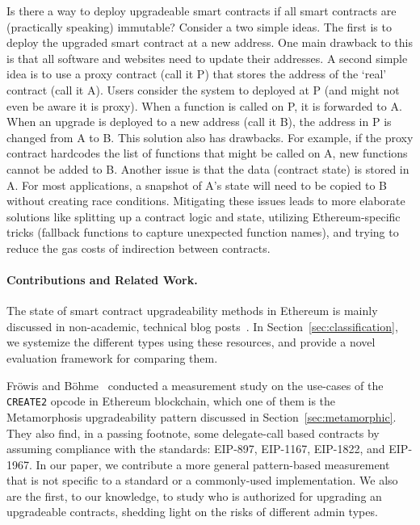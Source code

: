 Is there a way to deploy upgradeable smart contracts if all smart contracts are (practically speaking) immutable? Consider a two simple ideas. The first is to deploy the upgraded smart contract at a new address. One main drawback to this is that all software and websites need to update their addresses. A second simple idea is to use a proxy contract (call it P) that stores the address of the `real' contract (call it A). Users consider the system to deployed at P (and might not even be aware it is proxy). When a function is called on P, it is forwarded to A. When an upgrade is deployed to a new address (call it B), the address in P is changed from A to B. This solution also has drawbacks. For example, if the proxy contract hardcodes the list of functions that might be called on A, new functions cannot be added to B. Another issue is that the data (contract state) is stored in A. For most applications, a snapshot of A's state will need to be copied to B without creating race conditions. Mitigating these issues leads to more elaborate solutions like splitting up a contract logic and state, utilizing Ethereum-specific tricks (fallback functions to capture unexpected function names), and trying to reduce the gas costs of indirection between contracts.

\paragraph{Contributions and Related Work.} 
The state of smart contract upgradeability methods in Ethereum is mainly discussed in non-academic, technical blog posts~\cite{openzeppelinPost,tobBlogPost}. In Section~\ref{sec:classification}, we systemize the different types using these resources, and provide a novel evaluation framework for comparing them.

Fr{\"o}wis and B{\"o}hme~\cite{frowisnot} conducted a measurement study on the use-cases of the \texttt{CREATE2} opcode in Ethereum blockchain, which one of them is the Metamorphosis upgradeability pattern discussed in Section~\ref{sec:metamorphic}. They also find, in a passing footnote, some delegate-call based contracts by assuming compliance with the standards: EIP-897, EIP-1167, EIP-1822, and EIP-1967. In our paper, we contribute a more general pattern-based measurement that is not specific to a standard or a commonly-used implementation. We also are the first, to our knowledge, to study who is authorized for upgrading an upgradeable contracts, shedding light on the risks of different admin types.

